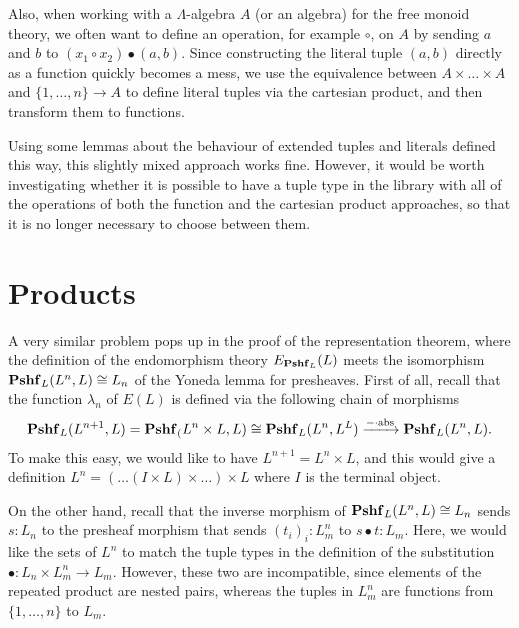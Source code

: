Also, when working with a $ \Lambda $-algebra $ A $ (or an algebra) for the free monoid theory, we often want to define an operation, for example $ \circ $, on $ A $ by sending $ a $ and $ b $ to $ (x_1 \circ x_2) \bullet (a, b) $. Since constructing the literal tuple $ (a, b) $ directly as a function quickly becomes a mess, we use the equivalence between $ A \times \dots \times A $ and $ \{ 1, \dots, n \} \to A $ to define literal tuples via the cartesian product, and then transform them to functions.

Using some lemmas about the behaviour of extended tuples and literals defined this way, this slightly mixed approach works fine. However, it would be worth investigating whether it is possible to have a tuple type in the library with all of the operations of both the function and the cartesian product approaches, so that it is no longer necessary to choose between them.

\section{Products}
A very similar problem pops up in the proof of the representation theorem, where the definition of the endomorphism theory $ E_{\mathbf{Pshf}_{L}}(L) $ meets the isomorphism $ \mathbf{Pshf}_{L}(L^n, L) \cong L_n $ of the Yoneda lemma for presheaves. First of all, recall that the function $ \lambda_n $ of $ E(L) $ is defined via the following chain of morphisms
\[ \mathbf{Pshf}_{L}(L^{n + 1}, L) = \mathbf{Pshf}_{(}L^n \times L, L) \cong \mathbf{Pshf}_{L}(L^n, L^L) \xrightarrow{- \cdot \text{abs}} \mathbf{Pshf}_{L}(L^n, L). \]
To make this easy, we would like to have $ L^{n + 1} = L^n \times L $, and this would give a definition $ L^n = ( \dots (I \times L) \times \dots) \times L $ where $ I $ is the terminal object.

On the other hand, recall that the inverse morphism of $ \mathbf{Pshf}_{L}(L^n, L) \cong L_n $ sends $ s: L_n $ to the presheaf morphism that sends $ (t_i)_i : L^n_m $ to $ s \bullet t : L_m $. Here, we would like the sets of $ L^n $ to match the tuple types in the definition of the substitution $ \bullet : L_n \times L_m^n \to L_m $. However, these two are incompatible, since elements of the repeated product are nested pairs, whereas the tuples in $ L_m^n $ are functions from $ \{ 1, \dots, n \} $ to $ L_m $.

